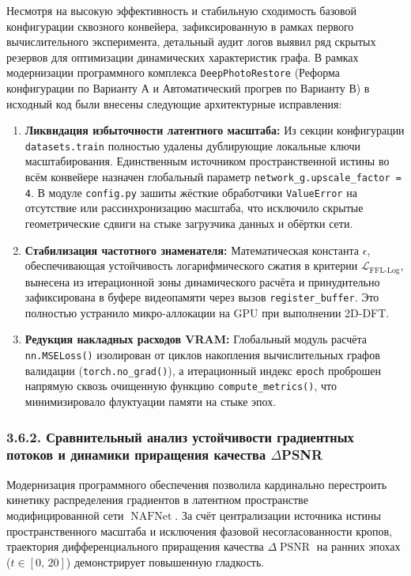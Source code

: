 \documentclass[12pt,a4paper]{article}
\begin{document}
Несмотря на высокую эффективность и стабильную сходимость базовой конфигурации сквозного конвейера, зафиксированную в рамках первого вычислительного эксперимента, детальный аудит логов выявил ряд скрытых резервов для оптимизации динамических характеристик графа. В рамках модернизации программного комплекса \texttt{DeepPhotoRestore} (Реформа конфигурации по Варианту А и Автоматический прогрев по Варианту В) в исходный код были внесены следующие архитектурные исправления:
\begin{enumerate}
    \item \textbf{Ликвидация избыточности латентного масштаба:} Из секции конфигурации \texttt{datasets.train} полностью удалены дублирующие локальные ключи масштабирования. Единственным источником пространственной истины во всём конвейере назначен глобальный параметр \texttt{network\_g.upscale\_factor = 4}. В модуле \texttt{config.py} зашиты жёсткие обработчики \texttt{ValueError} на отсутствие или рассинхронизацию масштаба, что исключило скрытые геометрические сдвиги на стыке загрузчика данных и обёртки сети.
    \item \textbf{Стабилизация частотного знаменателя:} Математическая константа $\epsilon$, обеспечивающая устойчивость логарифмического сжатия в критерии $\mathcal{L}_{\operatorname{FFL-Log}}$, вынесена из итерационной зоны динамического расчёта и принудительно зафиксирована в буфере видеопамяти через вызов \texttt{register\_buffer}. Это полностью устранило микро-аллокации на GPU при выполнении 2D-DFT.
    \item \textbf{Редукция накладных расходов VRAM:} Глобальный модуль расчёта \texttt{nn.MSELoss()} изолирован от циклов накопления вычислительных графов валидации (\texttt{torch.no\_grad()}), а итерационный индекс \texttt{epoch} проброшен напрямую сквозь очищенную функцию \texttt{compute\_metrics()}, что минимизировало флуктуации памяти на стыке эпох.
\end{enumerate}

\subsubsection{3.6.2. Сравнительный анализ устойчивости градиентных потоков и динамики приращения качества $\Delta$PSNR}

Модернизация программного обеспечения позволила кардинально перестроить кинетику распределения градиентов в латентном пространстве модифицированной сети $\operatorname{NAFNet}$. За счёт централизации источника истины пространственного масштаба и исключения фазовой несогласованности кропов, траектория дифференциального приращения качества $\Delta\operatorname{PSNR}$ на ранних эпохах ($t \in [0,\, 20]$) демонстрирует повышенную гладкость. 
\end{document}
